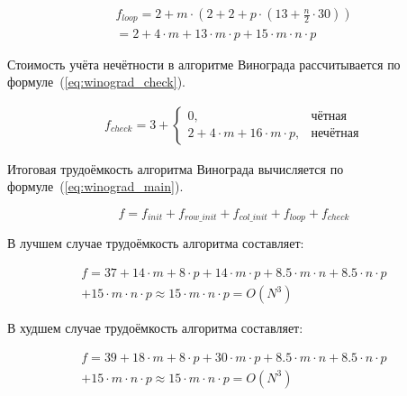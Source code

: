 \begin{equation}
    \label{eq:winograd_loop}
    \begin{gathered}
        f_{loop} = 2 + m \cdot (2 + 2 + p \cdot (13 + \frac{n}{2} \cdot 30)) \\
        = 2 + 4 \cdot m + 13 \cdot m \cdot p + 15 \cdot m \cdot n \cdot p
    \end{gathered}
\end{equation}

Стоимость учёта нечётности в алгоритме Винограда рассчитывается по формуле~(\ref{eq:winograd_check}).

\begin{equation}
    \label{eq:winograd_check}
    \begin{gathered}
        f_{check} = 3 + \begin{cases}
            0, & \text{чётная} \\
            2 + 4 \cdot m + 16 \cdot m \cdot p, & \text{нечётная}
        \end{cases}
    \end{gathered}
\end{equation}

Итоговая трудоёмкость алгоритма Винограда вычисляется по формуле~(\ref{eq:winograd_main}).

\begin{equation}
    \label{eq:winograd_main}
    f = f_{init} + f_{row\_init} + f_{col\_init} + f_{loop} + f_{check}
\end{equation}

В лучшем случае трудоёмкость алгоритма составляет:

\begin{equation}
    \begin{gathered}
        f = 37 + 14 \cdot m +  8 \cdot p + 14 \cdot m \cdot p 
        + 8.5 \cdot m \cdot n + 8.5 \cdot n \cdot p \\
        + 15 \cdot m \cdot n \cdot p \approx 15 \cdot m \cdot n \cdot p = O(N^3)
    \end{gathered}
\end{equation}

В худшем случае трудоёмкость алгоритма составляет:

\begin{equation}
    \begin{gathered}
        f = 39 + 18 \cdot m +  8 \cdot p + 30 \cdot m \cdot p 
        + 8.5 \cdot m \cdot n + 8.5 \cdot n \cdot p \\
        + 15 \cdot m \cdot n \cdot p \approx 15 \cdot m \cdot n \cdot p = O(N^3)
    \end{gathered}
\end{equation}

